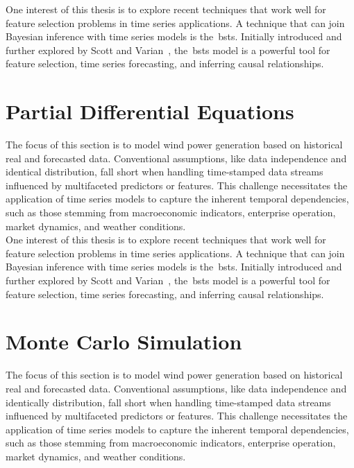     One interest of this thesis is to explore recent techniques that work well for feature selection problems in
    time series applications.
    A technique that can join Bayesian inference with time series models is the~\gls{bsts}.
    Initially introduced and further explored by Scott and Varian~\cite{scott_predicting_2013, scott_bayesian_2013},
    the~\gls{bsts} model is a powerful tool for feature selection,
time series forecasting, and inferring causal relationships. \\


\section{Partial Differential Equations}
    \label{sec:pde}

    The focus of this section is to model wind power generation based on historical real and forecasted data.
    Conventional assumptions, like data independence and identical distribution, fall short when handling time-stamped
    data streams influenced by multifaceted predictors or features.
    This challenge necessitates the application of time series models to capture the inherent temporal dependencies,
    such as those stemming from macroeconomic indicators, enterprise operation, market dynamics, and weather conditions.\\

    One interest of this thesis is to explore recent techniques that work well for feature selection problems in
    time series applications.
    A technique that can join Bayesian inference with time series models is the~\gls{bsts}.
    Initially introduced and further explored by Scott and Varian~\cite{scott_predicting_2013, scott_bayesian_2013},
    the~\gls{bsts} model is a powerful tool for feature selection,
time series forecasting, and inferring causal relationships. \\


\section{Monte Carlo Simulation}
    \label{sec:mc_sim}

    The focus of this section is to model wind power generation based on historical real and forecasted data.
    Conventional assumptions, like data independence and identically distribution, fall short when handling time-stamped
    data streams influenced by multifaceted predictors or features.
    This challenge necessitates the application of time series models to capture the inherent temporal dependencies,
    such as those stemming from macroeconomic indicators, enterprise operation, market dynamics, and weather conditions.\\

